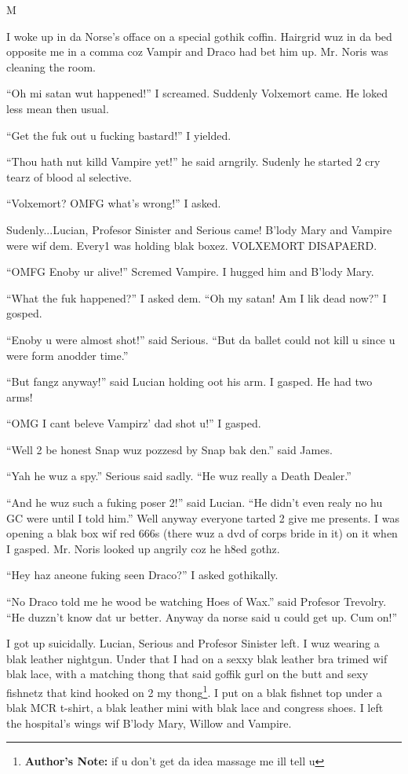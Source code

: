 M\documentclass{article}
\begin{document}
\textbreak
\linenumbers\resetlinenumber

I woke up in da Norse’s offace on a special gothik coffin. Hairgrid wuz in da bed opposite me in a comma coz Vampir and Draco had bet him up. Mr. Noris was cleaning the room.

“Oh mi satan wut happened!” I screamed. Suddenly Volxemort came. He loked less mean then usual.

“Get the fuk out u fucking bastard!” I yielded.

“Thou hath nut killd Vampire yet!” he said arngrily. Sudenly he started 2 cry tearz of blood al selective.

“Volxemort? OMFG what’s wrong!” I asked.

Sudenly...Lucian, Profesor Sinister and Serious came! B’lody Mary and Vampire were wif dem. Every1 was holding blak boxez. VOLXEMORT DISAPAERD.

“OMFG Enoby ur alive!” Scremed Vampire. I hugged him and B’lody Mary.

“What the fuk happened?” I asked dem. “Oh my satan! Am I lik dead now?” I gosped.

“Enoby u were almost shot!” said Serious. “But da ballet could not kill u since u were form anodder time.”

“But fangz anyway!” said Lucian holding oot his arm. I gasped. He had two arms!

“OMG I cant beleve Vampirz’ dad shot u!” I gasped.

“Well 2 be honest Snap wuz pozzesd by Snap bak den.” said James.

“Yah he wuz a spy.” Serious said sadly. “He wuz really a Death Dealer.”

“And he wuz such a fuking poser 2!” said Lucian. “He didn’t even realy no hu GC were until I told him.” Well anyway everyone tarted 2 give me presents. I was opening a blak box wif red 666s (there wuz a dvd of corps bride in it) on it when I gasped. Mr. Noris looked up angrily coz he h8ed gothz.

“Hey haz aneone fuking seen Draco?” I asked gothikally.

“No Draco told me he wood be watching Hoes of Wax.” said Profesor Trevolry. “He duzzn’t know dat ur better. Anyway da norse said u could get up. Cum on!”

I got up suicidally. Lucian, Serious and Profesor Sinister left. I wuz wearing a blak leather nightgun. Under that I had on a sexxy blak leather bra trimed wif blak lace, with a matching thong that said goffik gurl on the butt and sexy fishnetz that kind hooked on 2 my thong\footnote{\textbf{Author's Note: }if u don’t get da idea massage me ill tell u}. I put on a blak fishnet top under a blak MCR t-shirt, a blak leather mini with blak lace and congress shoes. I left the hospital’s wings wif B’lody Mary, Willow and Vampire.
\end{document}
